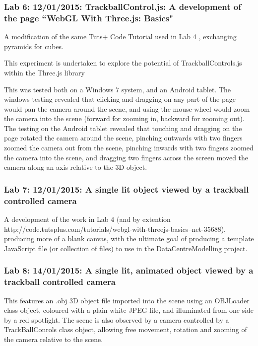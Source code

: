 \subsubsection{Lab 6: 12/01/2015: TrackballControl.js: A development of the page \newline``WebGL With Three.js: Basics"} 
\label{subSubSec:ThreeJSExperiments:Lab6}
A modification of the same Tuts+ Code Tutorial used in Lab 4 \cite{Tuts+ThreeJS}, exchanging pyramids for cubes.

This experiment is undertaken to explore the potential of TrackballControls.js within the Three.js library

This was tested both on a Windows 7 system, and an Android tablet. The windows testing revealed that clicking and dragging on any part of the page would pan the camera around the scene, and using the mouse-wheel would zoom the camera into the scene (forward for zooming in, backward for zooming out). The testing on the Android tablet revealed that touching and dragging on the page rotated the camera around the scene, pinching outwards with two fingers zoomed the camera out from the scene, pinching inwards with two fingers zoomed the camera into the scene, and dragging two fingers across the screen moved the camera along an axis relative to the 3D object.

\subsubsection{Lab 7: 12/01/2015: A single lit object viewed by a trackball controlled camera}
\label{subSubSec:ThreeJSExperiments:Lab7}
A development of the work in Lab 4 (and by extention http://code.tutsplus.com/tutorials/webgl-with-threejs-basics--net-35688), producing more of a blank canvas, with the ultimate goal of producing a template JavaScript file (or collection of files) to use in the DataCentreModelling project.

\subsubsection{Lab 8: 14/01/2015: A single lit, animated object viewed by a trackball controlled camera}
\label{subSubSec:ThreeJSExperiments:Lab8}
This features an .obj 3D object file imported into the scene using an OBJLoader class object, coloured with a plain white JPEG file, and illuminated from one side by a red spotlight. The scene is also observed by a camera controlled by a TrackBallConrols class object, allowing free movement, rotation and zooming of the camera relative to the scene.

